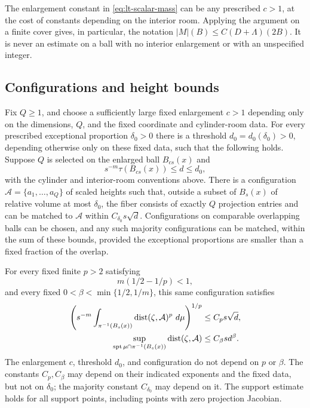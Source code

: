 \begin{remark}\label{rem:lt-scalar-radii}
The enlargement constant in \eqref{eq:lt-scalar-mass} can be any prescribed
$c>1$, at the cost of constants depending on the interior room.  Applying
the argument on a finite cover gives, in particular, the notation
$|M|(B)\le C(D+\Lambda)(2B)$.  It is never an estimate on a ball with no
interior enlargement or with an unspecified integer.
\end{remark}

\subsection{Configurations and height bounds}

\begin{lemma}
\label{lt:config}
Fix $Q\ge1$, and choose a sufficiently large fixed enlargement $c>1$
depending only on the dimensions, $Q$, and the fixed coordinate and
cylinder-room data.  For every prescribed exceptional proportion
$\delta_0>0$ there is a threshold $d_0=d_0(\delta_0)>0$, depending otherwise
only on these fixed data, such that the following holds.  Suppose $Q$ is
selected on the enlarged ball $B_{cs}(x)$ and
\[
 s^{-m}\tau(B_{cs}(x))\le d\le d_0,
\]
with the cylinder and interior-room conventions above.  There is a
configuration $\mathcal A=\{a_1,\ldots,a_Q\}$ of
scaled heights such that, outside a subset of $B_s(x)$ of relative volume
at most $\delta_0$, the fiber consists of exactly $Q$ projection entries and
can be matched to $\mathcal A$ within $C_{\delta_0}s\sqrt d$.
Configurations on comparable overlapping balls can be chosen, and any such
majority configurations can be matched, within the sum of these bounds,
provided the exceptional proportions are smaller than a fixed fraction of
the overlap.

For every fixed finite $p>2$ satisfying
\begin{equation}\label{eq:lt-p-range}
 m(1/2-1/p)<1,
\end{equation}
and every fixed $0<\beta<\min\{1/2,1/m\}$, this same configuration satisfies
\begin{align}
 \left(s^{-m}\int_{\pi^{-1}(B_s(x))}
       \operatorname{dist}(\zeta,\mathcal A)^p\,\mathop{}\!d\mu\right)^{1/p}
       &\le C_p s\sqrt d,\label{eq:lt-config-moment}\\
 \sup_{\operatorname{spt}\mu\cap\pi^{-1}(B_s(x))}
       \operatorname{dist}(\zeta,\mathcal A)&\le C_\beta s d^\beta.
       \label{eq:lt-config-sup}
\end{align}
The enlargement $c$, threshold $d_0$, and configuration do not depend on
$p$ or $\beta$.  The constants $C_p,C_\beta$ may depend on their indicated
exponents and the fixed data, but not on $\delta_0$; the majority constant
$C_{\delta_0}$ may depend on it.  The support estimate holds for all support
points, including points with zero projection Jacobian.
\end{lemma}

